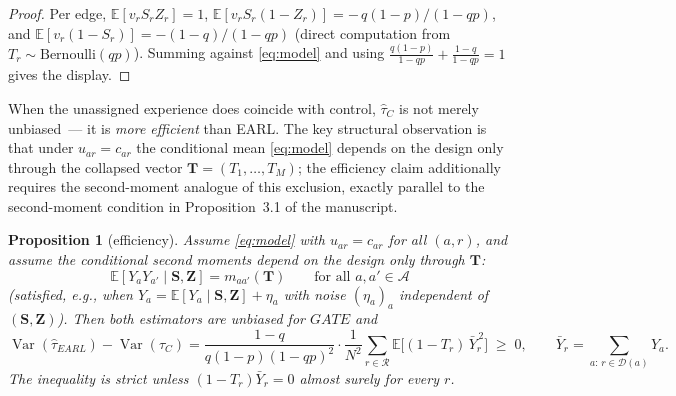 \documentclass[11pt]{article}
\newtheorem{proposition}{Proposition}
\theoremstyle{remark}
\newcommand{\E}{\mathbb{E}}
\newcommand{\var}{\operatorname{Var}}
\begin{document}
\begin{proof}
Per edge, $\E[v_r S_rZ_r] = 1$, $\E[v_r S_r(1-Z_r)] = -\,q(1-p)/(1-qp)$, and $\E[v_r(1-S_r)] = -(1-q)/(1-qp)$ (direct computation from $T_r \sim \mathrm{Bernoulli}(qp)$). Summing against \eqref{eq:model} and using $\tfrac{q(1-p)}{1-qp} + \tfrac{1-q}{1-qp} = 1$ gives the display.
\end{proof}

When the unassigned experience does coincide with control, $\hat\tau_C$ is not merely unbiased~--- it is \emph{more efficient} than EARL. The key structural observation is that under $u_{ar} = c_{ar}$ the conditional mean \eqref{eq:model} depends on the design only through the collapsed vector $\mathbf T = (T_1,\ldots,T_M)$; the efficiency claim additionally requires the second-moment analogue of this exclusion, exactly parallel to the second-moment condition in Proposition~3.1 of the manuscript.

\begin{proposition}[efficiency]\label{prop:c-efficiency}
Assume \eqref{eq:model} with $u_{ar} = c_{ar}$ for all $(a,r)$, and assume the conditional second moments depend on the design only through $\mathbf T$:
\begin{equation}\label{eq:2m}
\E[Y_a Y_{a'} \mid \mathbf S, \mathbf Z] = m_{aa'}(\mathbf T) \qquad \text{for all } a, a' \in \mathcal A
\end{equation}
(satisfied, e.g., when $Y_a = \E[Y_a\mid\mathbf S,\mathbf Z] + \eta_a$ with noise $(\eta_a)_{a}$ independent of $(\mathbf S, \mathbf Z)$). Then both estimators are unbiased for $GATE$ and
\[
\var(\hat\tau_{EARL}) - \var(\hat\tau_{C})
= \frac{1-q}{q(1-p)(1-qp)^2}\cdot \frac{1}{N^2}\sum_{r\in\mathcal R} \E\big[(1-T_r)\,\bar Y_r^{\,2}\big] \;\ge\; 0,
\qquad
\bar Y_r = \sum_{a:\, r\in\mathcal D(a)} Y_a .
\]
The inequality is strict unless $(1-T_r)\bar Y_r = 0$ almost surely for every $r$.
\end{proposition}
\end{document}
